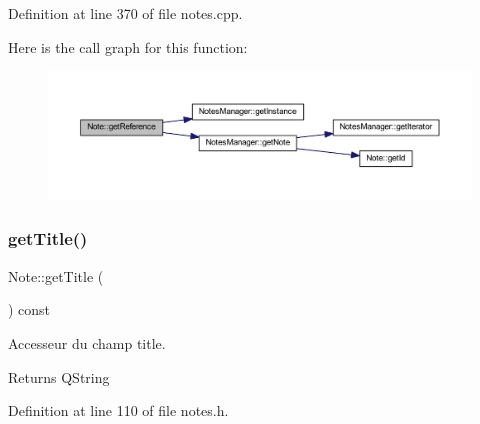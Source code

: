 Definition at line 370 of file notes.\+cpp.

Here is the call graph for this function\+:\nopagebreak
\begin{figure}[H]
\begin{center}
\leavevmode
\includegraphics[width=350pt]{class_note_a8e3ba6961f62a38f49b5fd209c083896_cgraph}
\end{center}
\end{figure}
\mbox{\label{class_note_afd40e5372b7fd231bbd31038bf0bb4d9}} 
\subsubsection{\texorpdfstring{get\+Title()}{getTitle()}}
{\footnotesize\ttfamily Note\+::get\+Title (\begin{DoxyParamCaption}{ }\end{DoxyParamCaption}) const\hspace{0.3cm}{\ttfamily [inline]}}



Accesseur du champ title. 

\begin{DoxyReturn}{Returns}
Q\+String 
\end{DoxyReturn}


Definition at line 110 of file notes.\+h.

